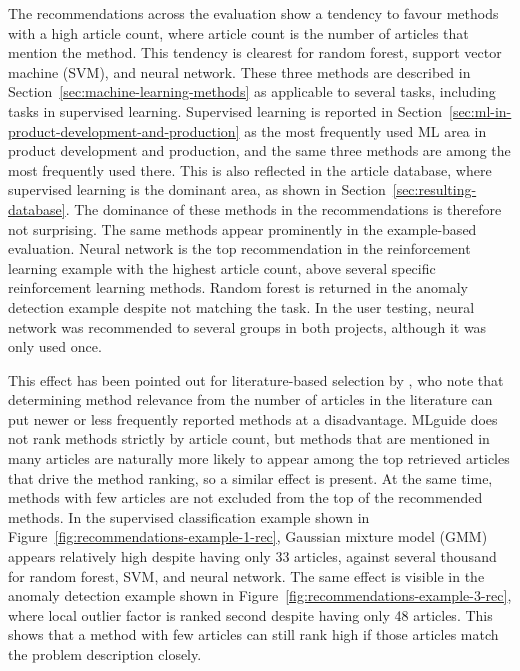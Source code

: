 The recommendations across the evaluation show a tendency to 
favour methods with a high article count, where article count 
is the number of articles that mention the method. This tendency 
is clearest for random forest, support vector machine (SVM), and neural 
network. These three methods are described in 
Section~\ref{sec:machine-learning-methods} as applicable to several 
tasks, including tasks in supervised learning. Supervised learning 
is reported in Section~\ref{sec:ml-in-product-development-and-production} 
as the most frequently used ML area in product development and 
production, and the same three methods are among the most frequently 
used there. This is also reflected in the article database, where 
supervised learning is the dominant area, as shown in 
Section~\ref{sec:resulting-database}. The dominance of these 
methods in the recommendations is therefore not surprising. The 
same methods appear prominently in the example-based 
evaluation. Neural network is the top recommendation in the 
reinforcement learning example with the highest article count, 
above several specific reinforcement learning methods.
Random forest is returned in the anomaly detection example 
despite not matching the task. In the user testing, neural 
network was recommended to several groups in both projects, 
although it was only used once. 

This effect has been pointed out for literature-based selection 
by \textcite{riesener2020}, who note that determining method 
relevance from the number of articles in the literature can put 
newer or less frequently reported methods at a disadvantage. 
MLguide does not rank methods strictly by article count, but 
methods that are mentioned in many articles are naturally more likely to 
appear among the top retrieved articles that drive the method 
ranking, so a similar effect is present. At the same time, 
methods with few articles are not excluded from the top of 
the recommended methods. In the supervised classification example shown in 
Figure~\ref{fig:recommendations-example-1-rec}, Gaussian 
mixture model (GMM) appears relatively high despite having only 33 
articles, against several thousand for random forest, SVM, and neural network. The same effect is visible in the 
anomaly detection example shown in 
Figure~\ref{fig:recommendations-example-3-rec}, where local 
outlier factor is ranked second despite having only 48 articles. 
This shows that a method with few articles can still rank high 
if those articles match the problem description closely.

